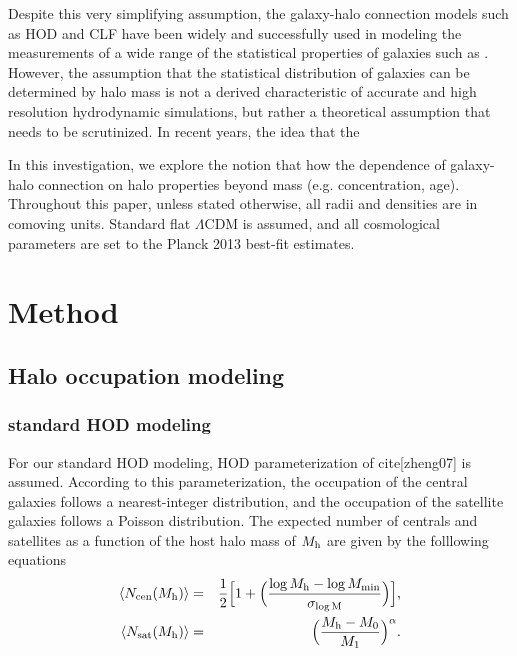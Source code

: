 \documentclass[12pt, preprint]{aastex}
\begin{document}
Despite this very simplifying assumption, the galaxy-halo connection models such as HOD and CLF
have been widely and successfully used in modeling the measurements of a wide range of the 
statistical properties of galaxies such as . However, the assumption that the statistical 
distribution of galaxies can be determined by halo mass is not a derived characteristic of 
accurate and high resolution hydrodynamic simulations, but rather a theoretical assumption 
that needs to be scrutinized. In recent years, the idea that the   

In this investigation, we explore the notion that how the dependence of 
galaxy-halo connection on halo properties beyond mass (e.g. concentration, age).
Throughout this paper, unless stated otherwise, 
all radii and densities are in comoving units. Standard flat $\Lambda$CDM is assumed, 
and all cosmological parameters are set to the Planck 2013 best-fit estimates.

\section{Method}
\subsection{Halo occupation modeling}
\subsubsection{standard HOD modeling}\label{subsubsec:hod}
For our standard HOD modeling, HOD parameterization of cite[zheng07] is assumed. According to this parameterization, the occupation of the central galaxies follows a nearest-integer distribution, 
and the occupation of the satellite galaxies follows a Poisson distribution. The expected number of centrals and satellites as a function of the host halo mass of $M_{\rm h}$ are given by the folllowing equations 
\begin{eqnarray}
\langle N_{\rm cen}(M_{\rm h}) \rangle &=& \frac{1}{2}\Big[1+\Big(\frac{\log M_{\rm h} - \log M_{\rm min}}{\sigma_{\log \rm{M}}} \Big) \Big], \label{hod:central}\\ 
\langle N_{\rm sat}(M_{\rm h}) \rangle &=& \Big( \frac{M_{\rm h} - M_{\rm{0}}}{M_{\rm 1}} \Big)^{\alpha}. \label{hod:satellite}
\end{eqnarray}
\end{document}
